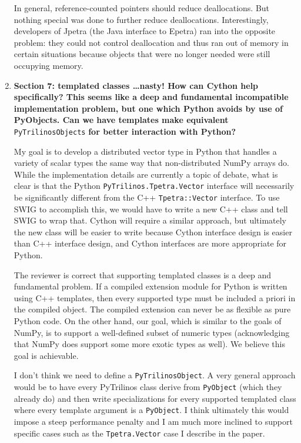 \documentclass[11pt]{article}
\begin{document}
\begin{enumerate}
In general, reference-counted pointers should reduce deallocations.  But nothing special was done to further reduce deallocations.  Interestingly, developers of Jpetra (the Java interface to Epetra) ran into the opposite problem: they could not control deallocation and thus ran out of memory in certain situations because objects that were no longer needed were still occupying memory.

\item {\bf Section 7: templated classes \ldots nasty! How can Cython help specifically? This seems like a deep and fundamental incompatible implementation problem, but one which Python avoids by use of PyObjects. Can we have templates make equivalent} {\tt PyTrilinosObjects} {\bf for better interaction with Python?}

My goal is to develop a distributed vector type in Python that handles a variety of scalar types the same way that non-distributed NumPy arrays do.  While the implementation details are currently a topic of debate, what is clear is that the Python {\tt PyTrilinos.Tpetra.Vector} interface will necessarily be significantly different from the C++ {\tt Tpetra::Vector} interface.  To use SWIG to accomplish this, we would have to write a new C++ class and tell SWIG to wrap that.  Cython will require a similar approach, but ultimately the new class will be easier to write because Cython interface design is easier than C++ interface design, and Cython interfaces are more appropriate for Python.

The reviewer is correct that supporting templated classes is a deep and fundamental problem.  If a compiled extension module for Python is written using C++ templates, then every supported type must be included a priori in the compiled object.  The compiled extension can never be as flexible as pure Python code.  On the other hand, our goal, which is similar to the goals of NumPy, is to support a well-defined subset of numeric types (acknowledging that NumPy does support some more exotic types as well).  We believe this goal is achievable.

I don't think we need to define a {\tt PyTrilinosObject}.  A very general approach would be to have every PyTrilinos class derive from {\tt PyObject} (which they already do) and then write specializations for every supported templated class where every template argument is a {\tt PyObject}.  I think ultimately this would impose a steep performance penalty and I am much more inclined to support specific cases such as the {\tt Tpetra.Vector} case I describe in the paper.

\end{enumerate}
\end{document}
